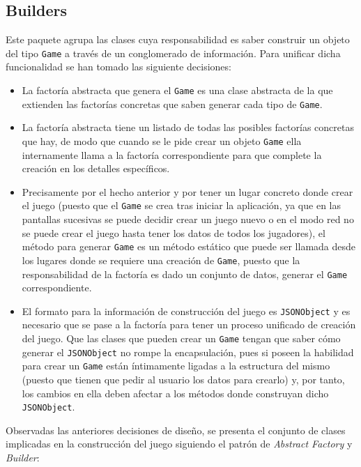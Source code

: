 \documentclass[../DocumentoOficial.tex]{subfiles}
\begin{document}
\subsection{Builders}
Este paquete agrupa las clases cuya responsabilidad es saber construir un objeto del tipo \texttt{Game} a través de un conglomerado de información. Para unificar dicha funcionalidad se han tomado las siguiente decisiones:
\begin{itemize}
\item La factoría abstracta que genera el \texttt{Game} es una clase abstracta de la que extienden las factorías concretas que saben generar cada tipo de \texttt{Game}.

\item La factoría abstracta tiene un listado de todas las posibles factorías concretas que hay, de modo que cuando se le pide crear un objeto \texttt{Game} ella internamente llama a la factoría correspondiente para que complete la creación en los detalles específicos.

\item Precisamente por el hecho anterior y por tener un lugar concreto donde crear el juego (puesto que el \texttt{Game} se crea tras iniciar la aplicación, ya que en las pantallas sucesivas se puede decidir crear un juego nuevo o en el modo red no se puede crear el juego hasta tener los datos de todos los jugadores), el método para generar \texttt{Game} es un método estático que puede ser llamada desde los lugares donde se requiere una creación de \texttt{Game}, puesto que la responsabilidad de la factoría es dado un conjunto de datos, generar el \texttt{Game} correspondiente.

\item El formato para la información de construcción del juego es \texttt{JSONObject} y es necesario que se pase a la factoría para tener un proceso unificado de creación del juego. Que las clases que pueden crear un \texttt{Game} tengan que saber cómo generar el \texttt{JSONObject} no rompe la encapsulación, pues si poseen la habilidad para crear un \texttt{Game} están íntimamente ligadas a la estructura del mismo (puesto que tienen que pedir al usuario los datos para crearlo) y, por tanto, los cambios en ella deben afectar a los métodos donde construyan dicho \texttt{JSONObject}.
\end{itemize}

Observadas las anteriores decisiones de diseño, se presenta el conjunto de clases implicadas en la construcción del juego siguiendo el patrón de \textit{Abstract Factory} y \textit{Builder}:
\end{document}
